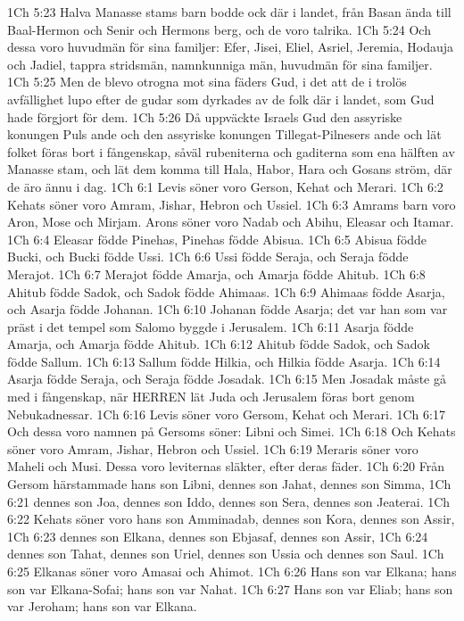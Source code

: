 1Ch 5:23  Halva Manasse stams barn bodde ock där i landet, från Basan ända till Baal-Hermon och Senir och Hermons berg, och de voro talrika.
1Ch 5:24  Och dessa voro huvudmän för sina familjer: Efer, Jisei, Eliel, Asriel, Jeremia, Hodauja och Jadiel, tappra stridsmän, namnkunniga män, huvudmän för sina familjer.
1Ch 5:25  Men de blevo otrogna mot sina fäders Gud, i det att de i trolös avfällighet lupo efter de gudar som dyrkades av de folk där i landet, som Gud hade förgjort för dem.
1Ch 5:26  Då uppväckte Israels Gud den assyriske konungen Puls ande och den assyriske konungen Tillegat-Pilnesers ande och lät folket föras bort i fångenskap, såväl rubeniterna och gaditerna som ena hälften av Manasse stam, och lät dem komma till Hala, Habor, Hara och Gosans ström, där de äro ännu i dag.
1Ch 6:1  Levis söner voro Gerson, Kehat och Merari.
1Ch 6:2  Kehats söner voro Amram, Jishar, Hebron och Ussiel.
1Ch 6:3  Amrams barn voro Aron, Mose och Mirjam. Arons söner voro Nadab och Abihu, Eleasar och Itamar.
1Ch 6:4  Eleasar födde Pinehas, Pinehas födde Abisua.
1Ch 6:5  Abisua födde Bucki, och Bucki födde Ussi.
1Ch 6:6  Ussi födde Seraja, och Seraja födde Merajot.
1Ch 6:7  Merajot födde Amarja, och Amarja födde Ahitub.
1Ch 6:8  Ahitub födde Sadok, och Sadok födde Ahimaas.
1Ch 6:9  Ahimaas födde Asarja, och Asarja födde Johanan.
1Ch 6:10  Johanan födde Asarja; det var han som var präst i det tempel som Salomo byggde i Jerusalem.
1Ch 6:11  Asarja födde Amarja, och Amarja födde Ahitub.
1Ch 6:12  Ahitub födde Sadok, och Sadok födde Sallum.
1Ch 6:13  Sallum födde Hilkia, och Hilkia födde Asarja.
1Ch 6:14  Asarja födde Seraja, och Seraja födde Josadak.
1Ch 6:15  Men Josadak måste gå med i fångenskap, när HERREN lät Juda och Jerusalem föras bort genom Nebukadnessar.
1Ch 6:16  Levis söner voro Gersom, Kehat och Merari.
1Ch 6:17  Och dessa voro namnen på Gersoms söner: Libni och Simei.
1Ch 6:18  Och Kehats söner voro Amram, Jishar, Hebron och Ussiel.
1Ch 6:19  Meraris söner voro Maheli och Musi. Dessa voro leviternas släkter, efter deras fäder.
1Ch 6:20  Från Gersom härstammade hans son Libni, dennes son Jahat, dennes son Simma,
1Ch 6:21  dennes son Joa, dennes son Iddo, dennes son Sera, dennes son Jeaterai.
1Ch 6:22  Kehats söner voro hans son Amminadab, dennes son Kora, dennes son Assir,
1Ch 6:23  dennes son Elkana, dennes son Ebjasaf, dennes son Assir,
1Ch 6:24  dennes son Tahat, dennes son Uriel, dennes son Ussia och dennes son Saul.
1Ch 6:25  Elkanas söner voro Amasai och Ahimot.
1Ch 6:26  Hans son var Elkana; hans son var Elkana-Sofai; hans son var Nahat.
1Ch 6:27  Hans son var Eliab; hans son var Jeroham; hans son var Elkana.
